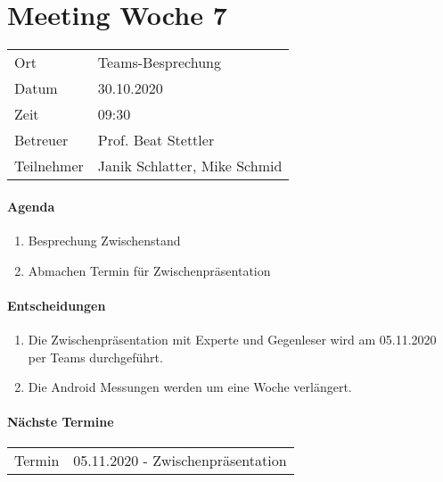 \section*{Meeting Woche 7}

\begin{table}[h!]
	\begin{tabularx}{\textwidth}{l X }
		Ort & Teams-Besprechung \\
		Datum & 30.10.2020 \\
		Zeit & 09:30 \\
        Betreuer & Prof. Beat Stettler\\
        
		Teilnehmer & Janik Schlatter, Mike Schmid \\
	\end{tabularx}
\end{table}

\paragraph{Agenda}
\begin{enumerate}
	\item Besprechung Zwischenstand
	\item Abmachen Termin für Zwischenpräsentation
\end{enumerate}

\paragraph{Entscheidungen}
\begin{enumerate}
	\item Die Zwischenpräsentation mit Experte und Gegenleser wird am 05.11.2020 
	per Teams durchgeführt.
	\item Die Android Messungen werden um eine Woche verlängert. 
\end{enumerate}

\paragraph{Nächste Termine} \hfill
\begin{table}[h!]
	\begin{tabularx}{\textwidth}{l X }
		Termin & 05.11.2020 - Zwischenpräsentation \\
	\end{tabularx}
\end{table}

\clearpage
